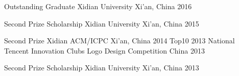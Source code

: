 
\begin{cvhonors}

  \cvhonor
    {Outstanding Graduate} %
    {Xidian University} %
    {Xi'an, China} %
    {2016} %

  \cvhonor
    {Second Prize Scholarship} %
    {Xidian University} %
    {Xi'an, China} %
    {2015} %

  \cvhonor
    {Second Prize} %
    {Xidian ACM/ICPC} %
    {Xi'an, China} %
    {2014} %
  \cvhonor
    {Top10} %
    {2013 National Tencent Innovation Clubs Logo Design Competition} %
    {China} %
    {2013} %

  \cvhonor
    {Second Prize Scholarship} %
    {Xidian University} %
    {Xi'an, China} %
    {2013} %

\end{cvhonors}
